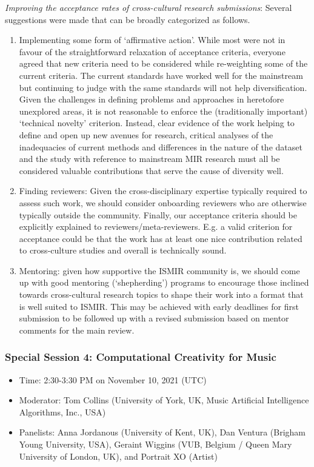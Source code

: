 \documentclass[%
10pt,								%
]
{scrartcl}
\begin{document}
                \textit{Improving the acceptance rates of cross-cultural research submissions}: Several suggestions were made that can be broadly categorized as follows.
                    \begin{enumerate}
                        \item   Implementing some form of ‘affirmative action’.  While most were not in favour of the straightforward relaxation of acceptance criteria, everyone agreed that new criteria need to be considered while re-weighting some of the current criteria. The current standards have worked well for the mainstream but continuing to judge with the same standards will not help diversification. Given the challenges in defining problems and approaches in heretofore unexplored areas, it is not reasonable to enforce the (traditionally important) ‘technical novelty’ criterion. Instead, clear evidence of the work helping to define and open up new avenues for research, critical analyses of the inadequacies of current methods and differences in the nature of the dataset and the study with reference to mainstream MIR research must all be considered valuable contributions that serve the cause of diversity well.
                        \item   Finding reviewers: Given the cross-disciplinary expertise typically required to assess such work, we should consider onboarding reviewers who are otherwise typically outside the community. Finally, our acceptance criteria should be explicitly explained to reviewers/meta-reviewers. E.g. a valid criterion for acceptance could be that the work has at least one nice contribution related to cross-culture studies and overall is technically sound.
                        \item   Mentoring: given how supportive the ISMIR community is, we should come up with good mentoring (‘shepherding’) programs to encourage those inclined towards cross-cultural research topics to shape their work into a format that is well suited to ISMIR.  This may be achieved with early deadlines for first submission to be followed up with a revised submission based on mentor comments for the main review.
                    \end{enumerate}


        \subsubsection{Special Session 4: Computational Creativity for Music}
        \begin{itemize}
            \item Time: 2:30-3:30 PM on November 10, 2021 (UTC)

            \item   Moderator: Tom Collins (University of York, UK, Music Artificial Intelligence Algorithms, Inc., USA)

            \item   Panelists: Anna Jordanous (University of Kent, UK), Dan Ventura (Brigham Young University, USA), Geraint Wiggins (VUB, Belgium / Queen Mary University of London, UK), and Portrait XO (Artist)
        \end{itemize}
\end{document}
